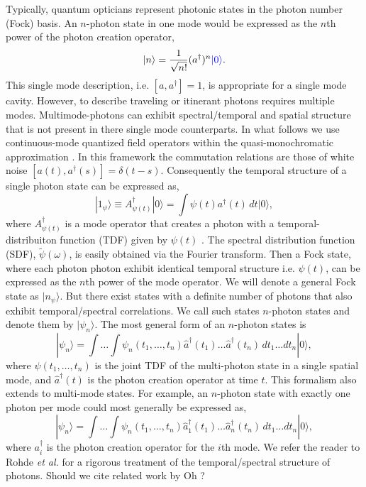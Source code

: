 \documentclass[aps,pra,twocolumn,amsmath,amssymb,color,superscriptaddress]{revtex4}
\newcommand{\ket}[1]{|#1\rangle}
\newcommand{\dg}{^\dagger}
\newcommand{\blue}{\color{blue}}
\begin{document}
Typically, quantum opticians represent photonic states in the photon number (Fock) basis. An $n$-photon state in one mode would be expressed as the $n$th power of the photon creation operator,
\begin{equation}
\ket{n} = \frac{1}{\sqrt{n!}}(a^\dag)^n {\blue \ket{0}}.
\end{equation}
{\blue This single mode description, i.e. $[a,a\dg]=1$, is appropriate for a single mode cavity. However, to describe traveling or itinerant photons requires multiple modes. Multimode-photons can exhibit spectral/temporal and spatial structure that is not present in there single mode counterparts. In what follows we use continuous-mode quantized field operators within the quasi-monochromatic approximation \cite{BlowLoudon}. In this framework the commutation relations are those of white noise $[a(t),a\dg(s)]= \delta(t-s)$.} Consequently the temporal structure of a single photon state can be expressed as,
\begin{equation}\label{onephoton}
\ket{1_\psi} \equiv A^\dag_{\psi(t)}\ket{0} = \int \psi(t)a^\dag(t) \,dt\ket{0},
\end{equation}
where $A^\dag_{\psi(t)}$ is a mode operator that creates a photon with a {\blue temporal-distribuiton function (TDF) given by \mbox{$\psi(t)$}  \cite{bib:RohdeMauererSilberhorn07,BlowLoudon}. The spectral distribution function (SDF), $\tilde\psi(\omega)$, is easily obtained via the Fourier transform. Then a Fock state, where each photon photon exhibit identical temporal structure i.e. $\psi(t)$, can be expressed as the $n$th power of the mode operator. We will denote a general Fock state as $\ket{n_\psi}$. But there exist states with a definite number of photons that also exhibit temporal/spectral correlations. We call such states $n$-photon states and denote them by $\ket{\psi_n}$. The most general form of an $n$-photon states is}
\begin{equation}
\ket{\psi_n} = \int \!\! \dots \!\! \int \psi_n(t_1,\dots,t_n) \hat{a}^\dag(t_1) \dots \hat{a}^\dag(t_n)\,dt_1\dots dt_n \ket{0},
\end{equation}
where \mbox{$\psi(t_1,\dots,t_n)$} is the joint TDF of the multi-photon state in a single spatial mode, and $\hat{a}^\dag(t)$ is the photon creation operator at time $t$. This formalism also extends to multi-mode states. For example, an $n$-photon state with exactly one photon per mode could most generally be expressed as,
\begin{equation} \label{eq:multi_mode}
\ket{\psi_n} = \int \!\! \dots \!\! \int \psi_n(t_1,\dots,t_n) \hat{a}_1^\dag(t_1) \dots \hat{a}_n^\dag(t_n)\,dt_1\dots dt_n \ket{0},
\end{equation}
where $a_i^\dag$ is the photon creation operator for the $i$th mode. We refer the reader to Rohde \emph{et al.} \cite{bib:RohdeMauererSilberhorn07} for a rigorous treatment of the temporal/spectral structure of photons. {\blue Should we cite related work by Oh ?}
\end{document}
